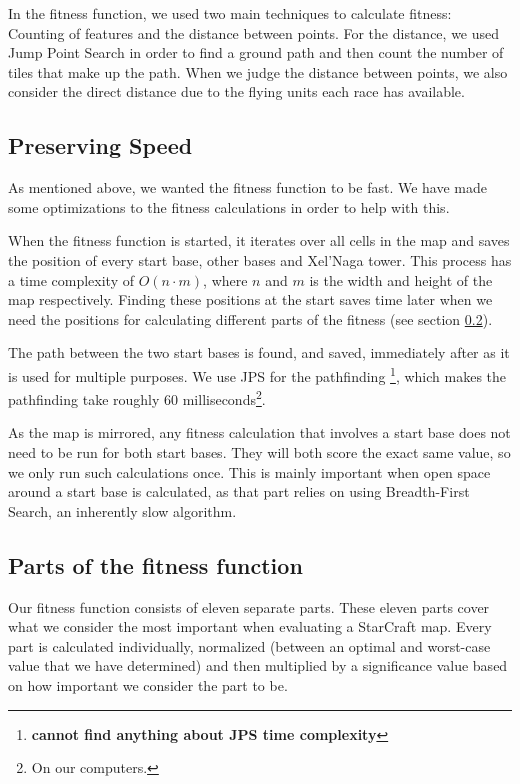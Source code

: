 In the fitness function, we used two main techniques to calculate fitness: Counting of features and the distance between points. For the distance, we used Jump Point Search\cite{harabor11a, harabor12, Podhraski2013jps} in order to find a ground path and then count the number of tiles that make up the path. When we judge the distance between points, we also consider the direct distance due to the flying units each race has available.

\subsection{Preserving Speed}
\label{MapFitness_Speed}

As mentioned above, we wanted the fitness function to be fast. We have made some optimizations to the fitness calculations in order to help with this.

When the fitness function is started, it iterates over all cells in the map and saves the position of every start base, other bases and Xel'Naga tower. This process has a time complexity of $O(n\cdot m)$, where $n$ and $m$ is the width and height of the map respectively. Finding these positions at the start saves time later when we need the positions for calculating different parts of the fitness (see section \ref{MapFitness_Parts}).

The path between the two start bases is found, and saved, immediately after as it is used for multiple purposes. We use JPS for the pathfinding \footnote{\textbf{cannot find anything about JPS time complexity}}, which makes the pathfinding take roughly 60 milliseconds\footnote{On our computers.}.

As the map is mirrored, any fitness calculation that involves a start base does not need to be run for both start bases. They will both score the exact same value, so we only run such calculations once. This is mainly important when open space around a start base is calculated, as that part relies on using Breadth-First Search, an inherently slow algorithm.

\subsection{Parts of the fitness function}
\label{MapFitness_Parts}

Our fitness function consists of eleven separate parts. These eleven parts cover what we consider the most important when evaluating a StarCraft map. Every part is calculated individually, normalized (between an optimal and worst-case value that we have determined) and then multiplied by a significance value based on how important we consider the part to be.

